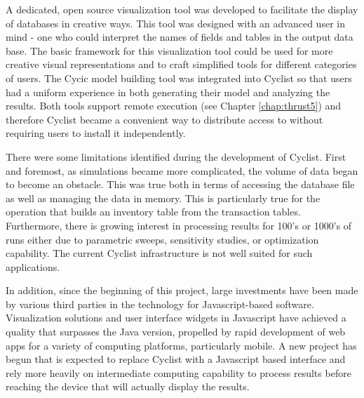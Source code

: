 A dedicated, open source visualization tool was developed to facilitate the
display of \Cyclus databases in creative ways.  This tool was designed with an
advanced user in mind - one who could interpret the names of fields and tables
in the output data base.  The basic framework for this visualization tool
could be used for more creative visual representations and to craft simplified
tools for different categories of users.  The Cycic model building tool was
integrated into Cyclist so that users had a uniform experience in both
generating their model and analyzing the results.  Both tools support remote
execution (see Chapter \ref{chap:thrust5}) and therefore Cyclist became a
convenient way to distribute access to \Cyclus without requiring users to
install it independently.

There were some limitations identified during the development of Cyclist.
First and foremost, as \Cyclus simulations became more complicated, the volume
of data began to become an obstacle.  This was true both in terms of accessing
the database file as well as managing the data in memory.  This is
particularly true for the operation that builds an inventory table from the
transaction tables.  Furthermore, there is growing interest in processing
results for 100's or 1000's of \Cyclus runs either due to parametric sweeps,
sensitivity studies, or optimization capability.  The current Cyclist
infrastructure is not well suited for such applications.

In addition, since the beginning of this project, large investments have been
made by various third parties in the technology for Javascript-based software.
Visualization solutions and user interface widgets in Javascript have achieved
a quality that surpasses the Java version, propelled by rapid development of
web apps for a variety of computing platforms, particularly mobile.  A new
project has begun that is expected to replace Cyclist with a Javascript based
interface and rely more heavily on intermediate computing capability to
process results before reaching the device that will actually display the
results.
